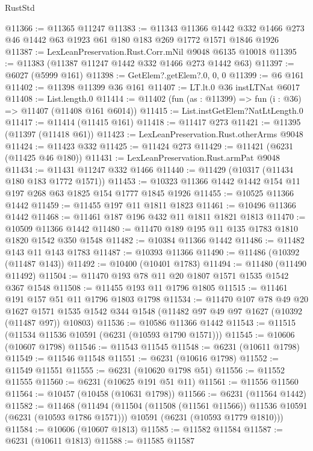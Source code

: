 \begin{lexlean}{RustStd}
\begin{coremodule}
{{@11366 := @11365 @11247
@11383 := @11343
    @11366
    @1442
    @332
    @1466
    @273
    @46
    @1442
    @63
    @1923
    @61
    @180
    @183
    @269
    @1772
    @1571
    @1846
    @1926
@11387 := LexLeanPreservation.Rust.Corr.mNil @9048 @6135 @10018
@11395 := @11383 (@11387 @11247 @1442 @332 @1466 @273 @1442 @63)
@11397 := @6027 (@5999 @161)
@11398 := GetElem?.getElem?.{0, 0, 0}
@11399 := @6 @161
@11402 := @11398 @11399 @36 @161
@11407 := LT.lt.{0} @36 instLTNat @6017
@11408 := List.length.{0}
@11414 := @11402 (fun (as : @11399) => fun (i : @36) => @11407 (@11408 @161 @6014))
@11415 := List.instGetElem?NatLtLength.{0}
@11417 := @11414 (@11415 @161)
@11418 := @11417 @273
@11421 := @11395 (@11397 (@11418 @61))
@11423 := LexLeanPreservation.Rust.otherArms @9048
@11424 := @11423 @332
@11425 := @11424 @273
@11429 := @11421 (@6231 (@11425 @46 @180))
@11431 := LexLeanPreservation.Rust.armPat @9048
@11434 := @11431 @11247 @332 @1466
@11440 := @11429 (@10317 (@11434 @180 @183 @1772 @1571))
@11453 := @10323 @11366 @1442 @1442 @154 @11 @197 @268 @63 @1825 @154 @1777 @1845 @1926
@11455 := @10525 @11366 @1442
@11459 := @11455 @197 @11 @1811 @1823
@11461 := @10496 @11366 @1442
@11468 := @11461 @187 @196 @432 @11 @1811 @1821 @1813
@11470 := @10509 @11366 @1442
@11480 := @11470 @189 @195 @11 @135 @1783 @1810 @1820 @1542 @350 @1548
@11482 := @10384 @11366 @1442
@11486 := @11482 @143 @11 @143 @1783
@11487 := @10393 @11366
@11490 := @11486 (@10392 (@11487 @143))
@11492 := @10400 (@10401 @1783)
@11494 := @11480 (@11490 @11492)
@11504 := @11470 @193 @78 @11 @20 @1807 @1571 @1535 @1542 @367 @1548
@11508 := @11455 @193 @11 @1796 @1805
@11515 := @11461 @191 @157 @51 @11 @1796 @1803 @1798
@11534 := @11470
    @107
    @78
    @49
    @20
    @1627
    @1571
    @1535
    @1542
    @344
    @1548
    (@11482 @97 @49 @97 @1627 (@10392 (@11487 @97)) @10803)
@11536 := @10586 @11366 @1442
@11543 := @11515 (@11534 @11536 @10591 (@6231 (@10593 @1790 @1571)))
@11545 := @10606 (@10607 @1798)
@11546 := @11543 @11545
@11548 := @6231 (@10611 @1798)
@11549 := @11546 @11548
@11551 := @6231 (@10616 @1798)
@11552 := @11549 @11551
@11555 := @6231 (@10620 @1798 @51)
@11556 := @11552 @11555
@11560 := @6231 (@10625 @191 @51 @11)
@11561 := @11556 @11560
@11564 := @10457 (@10458 (@10631 @1798))
@11566 := @6231 (@11564 @1442)
@11582 := @11468
    (@11494
      (@11504 (@11508 (@11561 @11566)) @11536 @10591 (@6231 (@10593 @1786 @1571)))
      @10591
      (@6231 (@10593 @1779 @1810)))
@11584 := @10606 (@10607 @1813)
@11585 := @11582 @11584
@11587 := @6231 (@10611 @1813)
@11588 := @11585 @11587
}}
\end{coremodule}
\end{lexlean}
